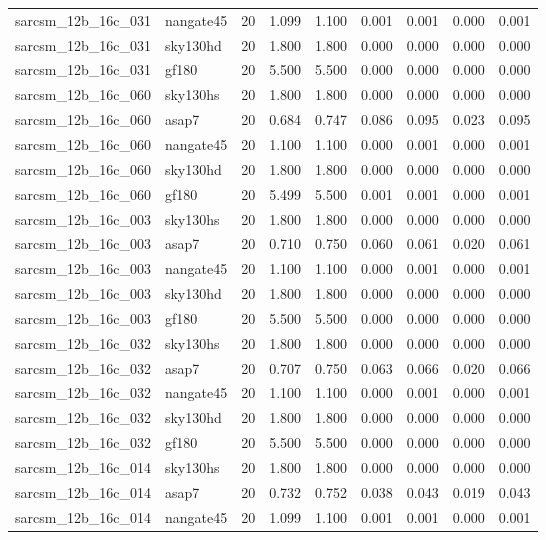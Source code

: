 \begin{tabular}{llrrrrrrr}
sarcsm\_12b\_16c\_031 & nangate45 & 20 & 1.099 & 1.100 & 0.001 & 0.001 & 0.000 & 0.001 \\
sarcsm\_12b\_16c\_031 & sky130hd & 20 & 1.800 & 1.800 & 0.000 & 0.000 & 0.000 & 0.000 \\
sarcsm\_12b\_16c\_031 & gf180 & 20 & 5.500 & 5.500 & 0.000 & 0.000 & 0.000 & 0.000 \\
sarcsm\_12b\_16c\_060 & sky130hs & 20 & 1.800 & 1.800 & 0.000 & 0.000 & 0.000 & 0.000 \\
sarcsm\_12b\_16c\_060 & asap7 & 20 & 0.684 & 0.747 & 0.086 & 0.095 & 0.023 & 0.095 \\
sarcsm\_12b\_16c\_060 & nangate45 & 20 & 1.100 & 1.100 & 0.000 & 0.001 & 0.000 & 0.001 \\
sarcsm\_12b\_16c\_060 & sky130hd & 20 & 1.800 & 1.800 & 0.000 & 0.000 & 0.000 & 0.000 \\
sarcsm\_12b\_16c\_060 & gf180 & 20 & 5.499 & 5.500 & 0.001 & 0.001 & 0.000 & 0.001 \\
sarcsm\_12b\_16c\_003 & sky130hs & 20 & 1.800 & 1.800 & 0.000 & 0.000 & 0.000 & 0.000 \\
sarcsm\_12b\_16c\_003 & asap7 & 20 & 0.710 & 0.750 & 0.060 & 0.061 & 0.020 & 0.061 \\
sarcsm\_12b\_16c\_003 & nangate45 & 20 & 1.100 & 1.100 & 0.000 & 0.001 & 0.000 & 0.001 \\
sarcsm\_12b\_16c\_003 & sky130hd & 20 & 1.800 & 1.800 & 0.000 & 0.000 & 0.000 & 0.000 \\
sarcsm\_12b\_16c\_003 & gf180 & 20 & 5.500 & 5.500 & 0.000 & 0.000 & 0.000 & 0.000 \\
sarcsm\_12b\_16c\_032 & sky130hs & 20 & 1.800 & 1.800 & 0.000 & 0.000 & 0.000 & 0.000 \\
sarcsm\_12b\_16c\_032 & asap7 & 20 & 0.707 & 0.750 & 0.063 & 0.066 & 0.020 & 0.066 \\
sarcsm\_12b\_16c\_032 & nangate45 & 20 & 1.100 & 1.100 & 0.000 & 0.001 & 0.000 & 0.001 \\
sarcsm\_12b\_16c\_032 & sky130hd & 20 & 1.800 & 1.800 & 0.000 & 0.000 & 0.000 & 0.000 \\
sarcsm\_12b\_16c\_032 & gf180 & 20 & 5.500 & 5.500 & 0.000 & 0.000 & 0.000 & 0.000 \\
sarcsm\_12b\_16c\_014 & sky130hs & 20 & 1.800 & 1.800 & 0.000 & 0.000 & 0.000 & 0.000 \\
sarcsm\_12b\_16c\_014 & asap7 & 20 & 0.732 & 0.752 & 0.038 & 0.043 & 0.019 & 0.043 \\
sarcsm\_12b\_16c\_014 & nangate45 & 20 & 1.099 & 1.100 & 0.001 & 0.001 & 0.000 & 0.001 \\

\end{tabular}
